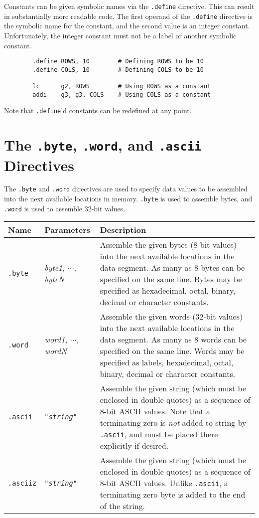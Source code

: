 Constants can be given symbolic names via the {\tt .define} directive. 
This can result in substantially more readable code.  The first
operand of the {\tt .define} directive is the symbolic name for the
constant, and the second value is an integer constant.  Unfortunately,
the integer constant must not be a label or another symbolic constant.

\vspace{3mm}
{\codesize
\begin{verbatim}
        .define ROWS, 10        # Defining ROWS to be 10
        .define COLS, 10        # Defining COLS to be 10

        lc      g2, ROWS        # Using ROWS as a constant
        addi    g3, g3, COLS    # Using COLS as a constant
\end{verbatim}}
\vspace{3mm}

Note that {\tt .define}'d constants can be redefined at any point.

\section{The {\tt .byte}, {\tt .word}, and {\tt .ascii} Directives}
\label{data-directive-sec}
\label{byte-figure}

The {\tt .byte} and {\tt .word} directives are used to specify data
values to be assembled into the next available locations in memory.
{\tt .byte} is used to assemble bytes, and {\tt .word} is used to
assemble 32-bit values.

\vspace{3mm}
\noindent
\begin{tabular}{|ll|p{4.0in}|}
\hline
{\bf Name}      & {\bf Parameters}      & {\bf Description}     \\
\hline
{\tt .byte}     & {\em byte1, $\cdots$, byteN }   &
		Assemble the given bytes (8-bit values) into the
		next available locations in the data segment.  As many
		as 8 bytes can be specified on the same line.  Bytes
		may be specified as hexadecimal, octal, binary, decimal
		or character constants.
                \\
{\tt .word}     & {\em word1, $\cdots$, wordN }   &
		Assemble the given words (32-bit values) into the
		next available locations in the data segment.  As many
		as 8 words can be specified on the same line.  Words
		may be specified as labels, hexadecimal, octal, binary, decimal
		or character constants.
                \\
{\tt .ascii}	& {\tt {\em "string"}}		&
		Assemble the given string (which must be enclosed
		in double quotes) as a sequence of 8-bit ASCII values.
		Note that a terminating zero is {\em not}
		added to string by {\tt .ascii}, and must be
		placed there explicitly if desired.
		\\
{\tt .asciiz}	& {\tt {\em "string"}}		&
		Assemble the given string (which must be enclosed
		in double quotes) as a sequence of 8-bit ASCII values.
		Unlike {\tt .ascii},
		a terminating zero byte is added to the end of the string.
		\\

\hline
\end{tabular}
\vspace{3mm}

